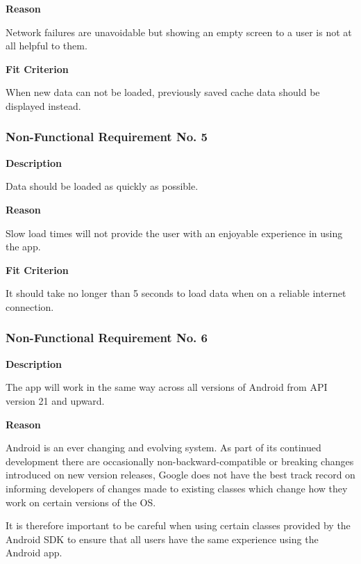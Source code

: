 \textbf{Reason}

Network failures are unavoidable but showing an empty screen to a user is not at all helpful to them.

\textbf{Fit Criterion}

When new data can not be loaded, previously saved cache data should be displayed instead.

\subsubsection{Non-Functional Requirement No. 5}

\textbf{Description}

Data should be loaded as quickly as possible.

\textbf{Reason}

Slow load times will not provide the user with an enjoyable experience in using the app.

\textbf{Fit Criterion}

It should take no longer than 5 seconds to load data when on a reliable internet connection.

\subsubsection{Non-Functional Requirement No. 6}

\textbf{Description}

The app will work in the same way across all versions of Android from API version 21 and upward.

\textbf{Reason}

Android is an ever changing and evolving system. As part of its continued development there are occasionally non-backward-compatible or breaking changes introduced on new version releases, Google does not have the best track record on informing developers of changes made to existing classes which change how they work on certain versions of the OS.


It is therefore important to be careful when using certain classes provided by the Android SDK to ensure that all users have the same experience using the Android app.

